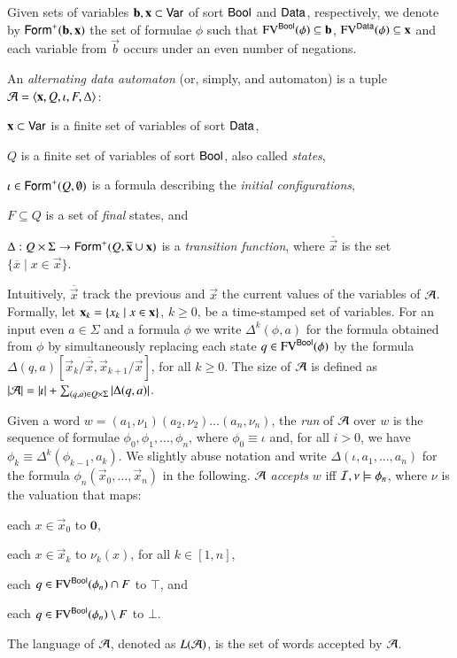 \documentclass{llncs}
\begin{document}
Given sets of variables $\mathbf b,\mathbf x \subset \mathsf{Var}$ of sort
$\mathsf{Bool}$ and $\mathsf{Data}$, respectively, we denote by
$\mathsf{Form}^+(\mathbf b,\mathbf x)$ the set of formulae $\phi$ such that
$\mathrm{FV}^{\mathsf{Bool}}(\phi) \subseteq \mathbf b$, $\mathrm{FV}^{\mathsf{Data}}(\phi) \subseteq
\mathbf x$ and each variable from $\vec{b}$ occurs under an even number
of negations. 

An \emph{alternating data automaton} (or, simply, and automaton) is a
tuple $\mathcal{A} = \left\langle \mathbf x,Q,\iota,F,\Delta \right\rangle$: \begin{compactitem}
%
\item $\mathbf x \subset \mathsf{Var}$ is a finite set of variables of sort
  $\mathsf{Data}$,
%
\item $Q$ is a finite set of variables of sort $\mathsf{Bool}$, also called
  \emph{states},
%
\item $\iota \in \mathsf{Form}^+(Q,\emptyset)$ is a formula describing the
  \emph{initial configurations},
%
\item $F \subseteq Q$ is a set of \emph{final} states, and
%
\item $\Delta : Q \times \Sigma \rightarrow
  \mathsf{Form}^+(Q,\overline{\mathbf x}\cup\mathbf x)$ is a \emph{transition
    function}, where $\overline{\vec{x}}$ is the set $\{\overline{x}
  \mid x \in \vec{x}\}$.
\end{compactitem}
Intuitively, $\overline{\vec{x}}$ track the previous and $\vec{x}$ the
current values of the variables of $\mathcal{A}$. Formally, let $\mathbf x_k =
\left\{ x_k \mid x \in \mathbf x \right\}$, $k\geq0$, be a time-stamped set of
variables. For an input even $a \in \Sigma$ and a formula $\phi$ we
write $\Delta^k(\phi,a)$ for the formula obtained from $\phi$ by
simultaneously replacing each state $q \in \mathrm{FV}^{\mathsf{Bool}}(\phi)$ by the
formula
$\Delta(q,a)[\vec{x}_k/\overline{\vec{x}},\vec{x}_{k+1}/\vec{x}]$, for
all $k\geq0$. The size of $\mathcal{A}$ is defined as ${|{\mathcal{A}}|} = {|{\iota}|} +
\sum_{(q,a) \in Q\times\Sigma}{|{\Delta(q,a)}|}$.

Given a word $w = (a_1,\nu_1)(a_2,\nu_2) \ldots (a_n,\nu_n)$, the
\emph{run} of $\mathcal{A}$ over $w$ is the sequence of formulae
$\phi_0,\phi_1,\ldots,\phi_n$, where $\phi_0 \equiv \iota$ and, for
all $i > 0$, we have $\phi_k \equiv \Delta^k(\phi_{k-1},a_k)$. We
slightly abuse notation and write $\Delta(\iota,a_1,\ldots,a_n)$ for
the formula $\phi_n(\vec{x}_0,\ldots,\vec{x}_n)$ in the
following. $\mathcal{A}$ \emph{accepts} $w$ iff $\mathcal{I},\nu \models \phi_n$, where
$\nu$ is the valuation that maps:\begin{inparaenum}[(1)]
\item each $x \in \vec{x}_0$ to $\mathbf{0}$, 
%
\item each $x \in \vec{x}_k$ to $\nu_k(x)$, for all $k\in[1,n]$, 
%
\item each $q \in \mathrm{FV}^{\mathsf{Bool}}(\phi_n) \cap F$ to $\top$, and 
%
\item each $q \in \mathrm{FV}^{\mathsf{Bool}}(\phi_n) \setminus F$ to $\bot$.
\end{inparaenum}
The language of $\mathcal{A}$, denoted as $L(\mathcal{A})$, is the set of words accepted
by $\mathcal{A}$. 
\end{document}
